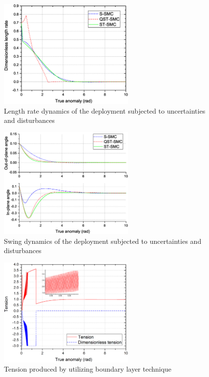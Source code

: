 \documentclass[3p]{elsarticle}
\theoremstyle{plain}
\theoremstyle{remark}
\begin{document}
\begin{figure}
\centering
\includegraphics[width=0.6\textwidth]{paper4_fig8_20161025.eps}
\caption{Length rate dynamics of the deployment subjected to uncertainties and disturbances}
\label{fig:8}
\end{figure}
\begin{figure}
\centering
\includegraphics[width=0.6\textwidth]{paper4_fig9_20161025.eps}
\caption{Swing dynamics of the deployment subjected to uncertainties and disturbances}
\label{fig:9}
\end{figure}
\begin{figure}
\centering
\includegraphics[width=0.6\textwidth]{paper4_fig10_20161025.eps}
\caption{Tension produced by utilizing boundary layer technique}
\label{fig:10}
\end{figure}
\end{document}
